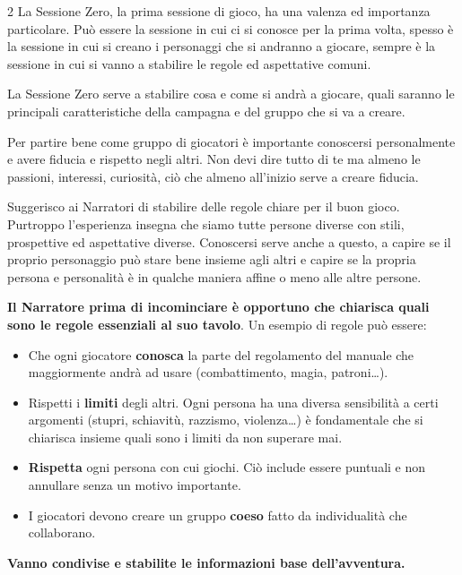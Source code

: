 \begin{multicols}{2}
La Sessione Zero, la prima sessione di gioco, ha una valenza ed importanza particolare. Può essere la sessione in cui ci si conosce per la prima volta, spesso è la sessione in cui si creano i personaggi che si andranno a giocare, sempre è la sessione in cui si vanno a stabilire le regole ed aspettative comuni.

La Sessione Zero serve a stabilire cosa e come si andrà a giocare, quali saranno le principali caratteristiche della campagna e del gruppo che si va a creare.

Per partire bene come gruppo di giocatori è importante conoscersi personalmente e avere fiducia e rispetto negli altri. Non devi dire tutto di te ma almeno le passioni, interessi, curiosità, ciò che almeno all'inizio serve a creare fiducia.

Suggerisco ai Narratori di stabilire delle regole chiare per il buon gioco. Purtroppo l'esperienza insegna che siamo tutte persone diverse con stili, prospettive ed aspettative diverse. Conoscersi serve anche a questo, a capire se il proprio personaggio può stare bene insieme agli altri e capire se la propria persona e personalità è in qualche maniera affine o meno alle altre persone.

\textbf{Il Narratore prima di incominciare è opportuno che chiarisca quali sono le regole essenziali al suo tavolo}. Un esempio di regole può essere:

\begin{itemize}[leftmargin=*] \setlength{\itemsep}{0pt}

\item Che ogni giocatore \textbf{conosca} la parte del regolamento del manuale che maggiormente andrà ad usare (combattimento, magia, patroni…).
\item Rispetti i \textbf{limiti} degli altri. Ogni persona ha una diversa sensibilità a certi argomenti (stupri, schiavitù, razzismo, violenza…) è fondamentale che si chiarisca insieme quali sono i limiti da non superare mai.
\item \textbf{Rispetta} ogni persona con cui giochi. Ciò include essere puntuali e non annullare senza un motivo importante.
\item I giocatori devono creare un gruppo \textbf{coeso} fatto da individualità che collaborano.
\end{itemize}

\textbf{Vanno condivise e stabilite le informazioni base dell'avventura.}

\medskip


\end{multicols}
